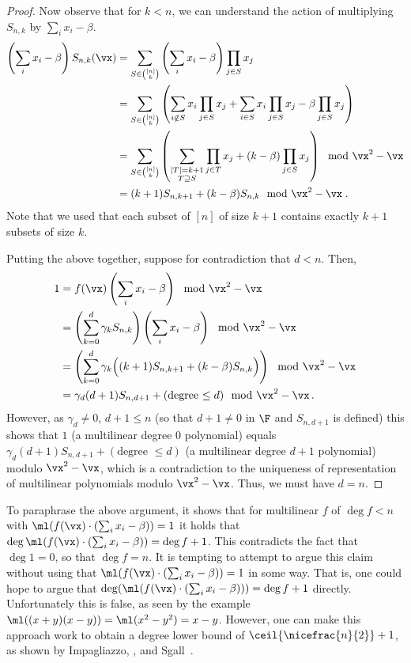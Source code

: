 \documentclass{toc}
\begin{document}
\begin{proof}
        Now observe that for $k<n$, we can understand the action of multiplying $S_{n,k}$ by $\sum_i x_i-\beta$.
        \begin{align*}
                \left(\sum_i x_i-\beta\right) S_{n,k}(\vx)
                &=\sum_{S\in\binom{[n]}{k}} \left(\sum_i x_i-\beta\right) \prod_{j\in S} x_j\\
                &=\sum_{S\in\binom{[n]}{k}} \left(\sum_{i\notin S} x_i \prod_{j\in S} x_j+\sum_{i\in S} x_i \prod_{j\in S} x_j-\beta \prod_{j\in S} x_j\right)\\
                &=\sum_{S\in\binom{[n]}{k}} \left(\sum_{\substack{|T|=k+1\\T\supseteq S}} \prod_{j\in T}x_j +(k-\beta) \prod_{j\in S} x_j\right) \mod \vx^2-\vx\\
                &=(k+1)S_{n,k+1}+(k-\beta)S_{n,k}\mod \vx^2-\vx
                \;.
        \end{align*}
        Note that we used that each subset of $[n]$ of size $k+1$ contains exactly $k+1$ subsets of size $k$.

        Putting the above together, suppose for contradiction that $d<n$.  Then,
        \begin{align*}
                1
                &=f(\vx)\left(\sum_i x_i-\beta\right) \mod \vx^2-\vx\\
                &=\left(\sum_{k=0}^d \gamma_k S_{n,k}\right)\left(\sum_i x_i-\beta\right) \mod \vx^2-\vx\\
                &=\left(\sum_{k=0}^d \gamma_k \Big((k+1)S_{n,k+1}+(k-\beta)S_{n,k}\Big)\right) \mod \vx^2-\vx\\
                &=\gamma_d(d+1)S_{n,d+1} + (\text{degree $\le d$}) \mod \vx^2-\vx\,.
        \end{align*}
        However, as $\gamma_d\ne 0$, $d+1\le n$ (so that $d+1\ne 0$ in $\F$ and $S_{n,d+1}$ is defined) this shows that $1$ (a multilinear degree 0 polynomial) equals $\gamma_d(d+1)S_{n,d+1} + (\text{degree $\le d$})$ (a multilinear degree $d+1$ polynomial) modulo $\vx^2-\vx$, which is a contradiction to the uniqueness of representation of multilinear polynomials modulo $\vx^2-\vx$.  Thus, we must have $d=n$.
\end{proof}

To paraphrase the above argument, it shows that for multilinear $f$ of $\deg f<n$ with $\ml(f(\vx)\cdot (\sum_i x_i-\beta))=1$ it holds that $\deg \ml(f(\vx)\cdot (\sum_i x_i-\beta))=\deg f+1$. This contradicts the fact that $\deg 1=0$, so that $\deg f=n$.  It is tempting to attempt to argue this claim without using that $\ml(f(\vx)\cdot (\sum_i x_i-\beta))=1$ in some way. That is, one could hope to argue that $\deg(\ml(f(\vx)\cdot(\sum_i x_i-\beta)))= \deg f+1$ directly.  Unfortunately this is false, as seen by the example $\ml((x+y)(x-y))=\ml(x^2-y^2)=x-y$.  However, one can make this approach work to obtain a degree lower bound of $\ceil{\nicefrac{n}{2}}+1$, as shown by Impagliazzo, \Pudlak, and Sgall~\cite{IPS99}.
\end{document}
